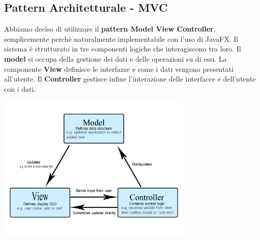 \documentclass{article}
\begin{document}
    \subsection{Pattern Architetturale - MVC}
    Abbiamo deciso di utilizzare il \textbf{pattern Model View Controller}, semplicemente perchè naturalmente implementabile con l'uso di JavaFX. Il sistema è strutturato in tre componenti logiche che interagiscono tra loro. Il \textbf{model} si occupa della gestione dei dati e delle operazioni su di essi. La componente \textbf{View} definisce le interfazze e come i dati vengono presentati all'utente. Il \textbf{Controller} 
    gestisce infine l'interazione delle interfacce e dell'utente con i dati.
        \begin{center}
            \includegraphics[width=0.70\textwidth]{pictures/mvc.png}
        \end{center}
		
\newpage
\end{document}
